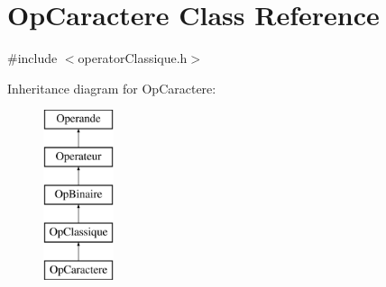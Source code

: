 \hypertarget{class_op_caractere}{}\section{Op\+Caractere Class Reference}
\label{class_op_caractere}


{\ttfamily \#include $<$operator\+Classique.\+h$>$}

Inheritance diagram for Op\+Caractere\+:\begin{figure}[H]
\begin{center}
\leavevmode
\includegraphics[height=5.000000cm]{class_op_caractere}
\end{center}
\end{figure}
